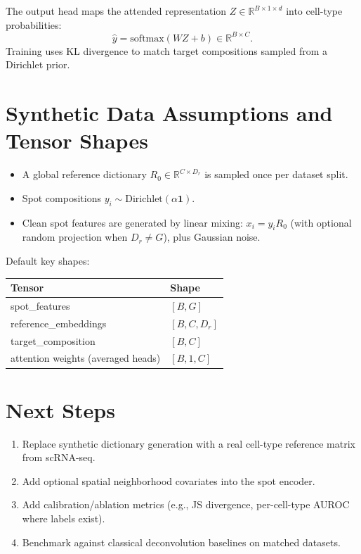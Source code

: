\documentclass[11pt]{article}
\begin{document}
The output head maps the attended representation $Z \in \mathbb{R}^{B \times 1 \times d}$
into cell-type probabilities:
\begin{equation}
\hat{y}=\text{softmax}(WZ+b) \in \mathbb{R}^{B \times C}.
\end{equation}
Training uses KL divergence to match target compositions sampled from a Dirichlet prior.

\section{Synthetic Data Assumptions and Tensor Shapes}
\begin{itemize}
    \item A global reference dictionary $R_0 \in \mathbb{R}^{C \times D_r}$ is sampled once per dataset split.
    \item Spot compositions $y_i \sim \text{Dirichlet}(\alpha\mathbf{1})$.
    \item Clean spot features are generated by linear mixing: $x_i = y_i R_0$ (with optional random projection when $D_r \neq G$), plus Gaussian noise.
\end{itemize}

Default key shapes:
\begin{center}
\begin{tabular}{ll}
\toprule
Tensor & Shape \\
\midrule
spot\_features & $[B, G]$ \\
reference\_embeddings & $[B, C, D_r]$ \\
target\_composition & $[B, C]$ \\
attention weights (averaged heads) & $[B, 1, C]$ \\
\bottomrule
\end{tabular}
\end{center}

\section{Next Steps}
\begin{enumerate}
    \item Replace synthetic dictionary generation with a real cell-type reference matrix from scRNA-seq.
    \item Add optional spatial neighborhood covariates into the spot encoder.
    \item Add calibration/ablation metrics (e.g., JS divergence, per-cell-type AUROC where labels exist).
    \item Benchmark against classical deconvolution baselines on matched datasets.
\end{enumerate}
\end{document}
